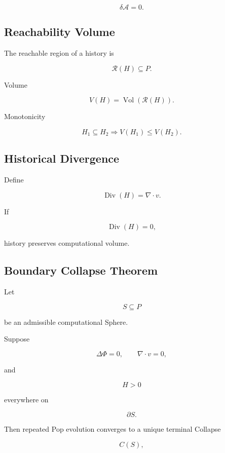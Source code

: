 \documentclass[12pt,oneside]{article}
\theoremstyle{definition}
\theoremstyle{remark}
\begin{document}
\[
\delta
\mathcal A
=
0.
\]

\subsection*{Reachability Volume}

The reachable region of a history is

\[
\mathcal R(H)
\subseteq
P.
\]

Volume

\[
V(H)
=
\operatorname{Vol}
(\mathcal R(H)).
\]

Monotonicity

\[
H_1
\subseteq
H_2
\Longrightarrow
V(H_1)
\le
V(H_2).
\]

\subsection*{Historical Divergence}

Define

\[
\operatorname{Div}(H)
=
\nabla\cdot v.
\]

If

\[
\operatorname{Div}(H)=0,
\]

history preserves computational volume.

\subsection*{Boundary Collapse Theorem}

Let

\[
S
\subseteq
P
\]

be an admissible computational Sphere.

Suppose

\[
\Delta\Phi=0,
\qquad
\nabla\cdot v=0,
\]

and

\[
H>0
\]

everywhere on

\[
\partial S.
\]

Then repeated Pop evolution converges to a unique terminal Collapse

\[
C(S),
\]
\end{document}
